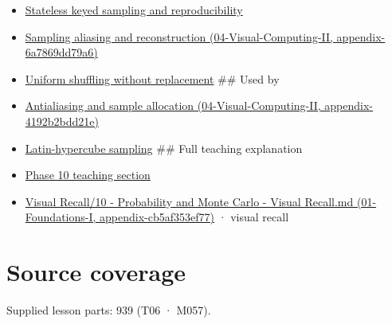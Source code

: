 \begin{itemize}
\item
  \hyperref[appendix-daaf25bfd3a0]{Stateless keyed sampling and reproducibility}
\item
  \href{../04-Visual-Computing-II/main.pdf\#nameddest=appendix-6a7869dd79a6}{Sampling aliasing and reconstruction (04-Visual-Computing-II, appendix-6a7869dd79a6)}
\item
  \hyperref[appendix-184fcc411663]{Uniform shuffling without replacement} \#\# Used by
\item
  \href{../04-Visual-Computing-II/main.pdf\#nameddest=appendix-4192b2bdd21e}{Antialiasing and sample allocation (04-Visual-Computing-II, appendix-4192b2bdd21e)}
\item
  \hyperref[appendix-1c5e85693a06]{Latin-hypercube sampling} \#\# Full teaching explanation
\item
  \href{Continuous\%20Notes/Computing\%20Foundations\%20-\%20From\%20Bits\%20to\%20C++\%20and\%20Systems\%20APIs\#6.\%20A\%20computer\%20produces\%20deterministic\%20pseudorandom\%20sequences}{Phase 10 teaching section}
\item
  \href{../01-Foundations-I/main.pdf\#nameddest=appendix-cb5af353ef77}{Visual Recall/10 - Probability and Monte Carlo - Visual Recall.md (01-Foundations-I, appendix-cb5af353ef77)} · visual recall
\end{itemize}

\section{Source coverage}\label{appendix-9f693ffd82bc-source-coverage}

Supplied lesson parts: 939 (T06 · M057).
